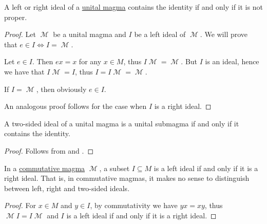 \begin{proposition}\label{thm:proper_ideals_containing_identity}
  A left or right ideal of a \hyperref[def:unital_magma]{unital magma} contains the identity if and only if it is not proper.
\end{proposition}
\begin{proof}
  Let \( \mscrM \) be a unital magma and \( I \) be a left ideal of \( \mscrM \). We will prove that \( e \in I \iff I = \mscrM \).

  \SufficiencySubProof Let \( e \in I \). Then \( ex = x \) for any \( x \in M \), thus \( I\mscrM = \mscrM \). But \( I \) is an ideal, hence we have that \( I\mscrM = I \), thus \( I = I\mscrM = \mscrM \).

  \NecessitySubProof If \( I = \mscrM \), then obviously \( e \in I \).

  An analogous proof follows for the case when \( I \) is a right ideal.
\end{proof}

\begin{corollary}\label{thm:unital_magma_ideal_is_submagma_iff_contains_identity}
  A two-sided ideal of a unital magma is a unital submagma if and only if it contains the identity.
\end{corollary}
\begin{proof}
  Follows from  and .
\end{proof}

\begin{proposition}\label{thm:commutative_magma_ideals}
  In a \hyperref[def:magma/commutative]{commutative magma} \( \mscrM \), a subset \( I \subseteq M \) is a left ideal if and only if it is a right ideal. That is, in commutative magmas, it makes no sense to distinguish between left, right and two-sided ideals.
\end{proposition}
\begin{proof}
  For \( x \in M \) and \( y \in I \), by commutativity we have \( yx = xy \), thus \( \mscrM I = I \mscrM \) and \( I \) is a left ideal if and only if it is a right ideal.
\end{proof}


